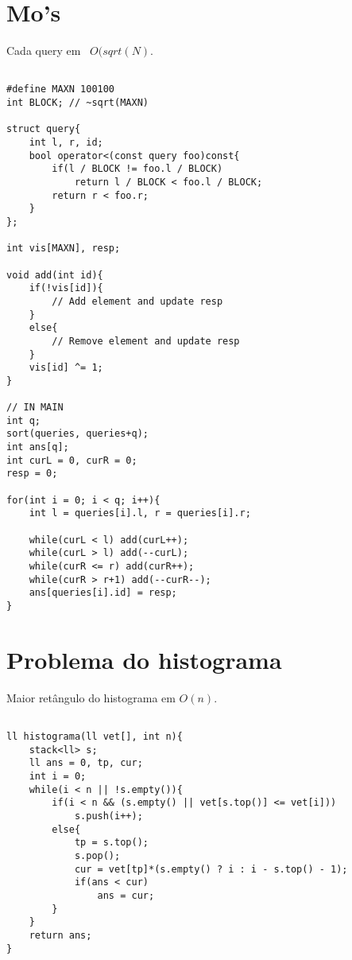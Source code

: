 \section{Mo's}
Cada query em ~$O(sqrt(N)$.
\begin{multicols}{2}
\begin{lstlisting}

#define MAXN 100100
int BLOCK; // ~sqrt(MAXN)

struct query{
	int l, r, id;
	bool operator<(const query foo)const{
		if(l / BLOCK != foo.l / BLOCK)
			return l / BLOCK < foo.l / BLOCK;
		return r < foo.r;
	}
};

int vis[MAXN], resp;

void add(int id){
	if(!vis[id]){
		// Add element and update resp
	}
	else{
		// Remove element and update resp
	}
	vis[id] ^= 1;
}

// IN MAIN
int q;
sort(queries, queries+q);
int ans[q];
int curL = 0, curR = 0;
resp = 0;

for(int i = 0; i < q; i++){
	int l = queries[i].l, r = queries[i].r;
	
	while(curL < l)	add(curL++);
	while(curL > l) add(--curL);
	while(curR <= r) add(curR++);
	while(curR > r+1) add(--curR--);
	ans[queries[i].id] = resp;
}

\end{lstlisting}
\end{multicols}

\section{Problema do histograma}
Maior retângulo do histograma em $O(n)$.
\begin{multicols}{2}
	\begin{lstlisting}

ll histograma(ll vet[], int n){
	stack<ll> s;
	ll ans = 0, tp, cur;
	int i = 0;
	while(i < n || !s.empty()){
		if(i < n && (s.empty() || vet[s.top()] <= vet[i]))
			s.push(i++);
		else{
			tp = s.top();
			s.pop();
			cur = vet[tp]*(s.empty() ? i : i - s.top() - 1);
			if(ans < cur)
				ans = cur;
		}
	}
	return ans;
}

\end{lstlisting}
\end{multicols}

